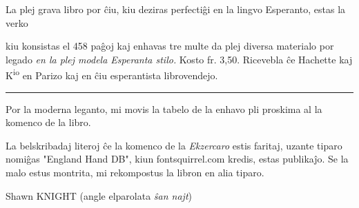 \documentclass[11pt,twoside]{book}
\begin{document}
\frontmatter
\sloppy

%

\begin{titlepage}
\vspace*{\fill}
\parbox{0.9\textwidth}{}
\vspace*{\fill}
\end{titlepage}

%
%


%
%


%
%
\renewcommand{\footrulewidth}{0.4pt}

\zamenhof

\cleardoublepage
















\vspace{1ex}

\leftpointright La plej grava libro por ĉiu, kiu deziras perfectiĝi en la lingvo Esperanto, estas la verko
\begin{center}
\end{center}

{\setlength{\parindent}{0pt} kiu konsistas el 458 paĝoj kaj enhavas tre multe da plej diversa materialo por legado \textit{en la plej modela Esperanta stilo.} Kosto fr. 3,50. Ricevebla ĉe Hachette kaj K\textsuperscript{io} en Parizo kaj en ĉiu esperantista librovendejo.}

{\centering\rule{13mm}{0.4pt}\par}

\cleardoublepage



%
%
%
\kolofono

Por la moderna leganto, mi movis la tabelo de la enhavo pli proskima al la komenco de la libro.

La belskribadaj literoj ĉe la komenco de la \emph{Ekzercaro} estis faritaj, uzante tiparo nomiĝas "England Hand DB", kiun fontsquirrel.com kredis, estas publikaĵo.  Se la malo estus montrita, mi rekompostus la libron en alia tiparo.

\vspace{1ex}

{\setlength{\parindent}{0em}
Shawn KNIGHT (angle elparolata \emph{ŝan najt})\\
\hodiau}


\end{document}
